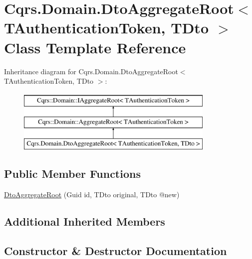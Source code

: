 \hypertarget{classCqrs_1_1Domain_1_1DtoAggregateRoot}{}\section{Cqrs.\+Domain.\+Dto\+Aggregate\+Root$<$ T\+Authentication\+Token, T\+Dto $>$ Class Template Reference}
\label{classCqrs_1_1Domain_1_1DtoAggregateRoot}
Inheritance diagram for Cqrs.\+Domain.\+Dto\+Aggregate\+Root$<$ T\+Authentication\+Token, T\+Dto $>$\+:\begin{figure}[H]
\begin{center}
\leavevmode
\includegraphics[height=3.000000cm]{classCqrs_1_1Domain_1_1DtoAggregateRoot}
\end{center}
\end{figure}
\subsection*{Public Member Functions}
\begin{DoxyCompactItemize}
\item 
\hyperlink{classCqrs_1_1Domain_1_1DtoAggregateRoot_aa99d95d5b4b1fb8a59beda77f7e12c20_aa99d95d5b4b1fb8a59beda77f7e12c20}{Dto\+Aggregate\+Root} (Guid id, T\+Dto original, T\+Dto @new)
\end{DoxyCompactItemize}
\subsection*{Additional Inherited Members}


\subsection{Constructor \& Destructor Documentation}
\mbox{\label{classCqrs_1_1Domain_1_1DtoAggregateRoot_aa99d95d5b4b1fb8a59beda77f7e12c20_aa99d95d5b4b1fb8a59beda77f7e12c20}} 
